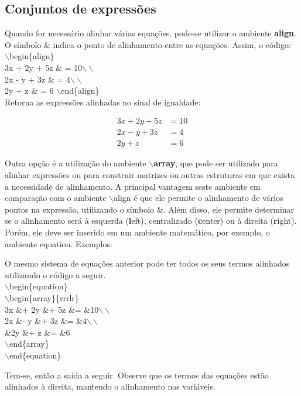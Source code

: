 \subsection{Conjuntos de expressões}
Quando for necessário alinhar várias equações, pode-se utilizar o ambiente \textbf{align}. O símbolo $\&$ indica o ponto de alinhamento entre as equações. Assim, o código:\\

\noindent
$\backslash$begin\{align\}\\
3x + 2y + 5z $\&$ = 10$\backslash\backslash$\\
2x - y + 3z $\&$ = 4$\backslash\backslash$\\
2y + z $\&$ = 6
$\backslash$end\{align\} \\

Retorna as expressões alinhadas no sinal de igualdade:

\begin{align}
3x + 2y + 5z &= 10\\
2x - y + 3z &= 4\\
2y + z &= 6 
\end{align}

Outra opção é a utilização do ambiente \textbf{$\backslash$array}, que pode ser utilizado para alinhar expressões ou para construir matrizes ou outras estruturas em que exista a necessidade de alinhamento. A principal vantagem seste ambiente em comparação com o ambiente $\backslash$align é que ele permite o alinhamento de vários pontos na expressão, utilizando o símbolo \&. Além disso, ele permite determinar se o alinhamento será à esquerda (\textbf{l}eft), centralizado (\textbf{c}enter) ou à direita (\textbf{r}ight). Porém, ele deve ser inserido em um ambiente matemático, por exemplo, o ambiente equation. Exemplos:

O mesmo sistema de equações anterior pode ter todos os seus termos alinhados utilizando o código a seguir.\\

\noindent
$\backslash$begin\{equation\}\\
$\backslash$begin\{array\}\{rrrlr\}\\
3x \&+ 2y \&+ 5z \&= \&10$\backslash\backslash$\\
2x \&- y \&+ 3z \&= \&4$\backslash\backslash$\\
\&2y \&+ z \&= \&6 \\
$\backslash$end\{array\}\\
$\backslash$end\{equation\}

Tem-se, então a saída a seguir. Observe que os termos das equações estão alinhados à direita, mantendo o alinhamento nas variáveis.

